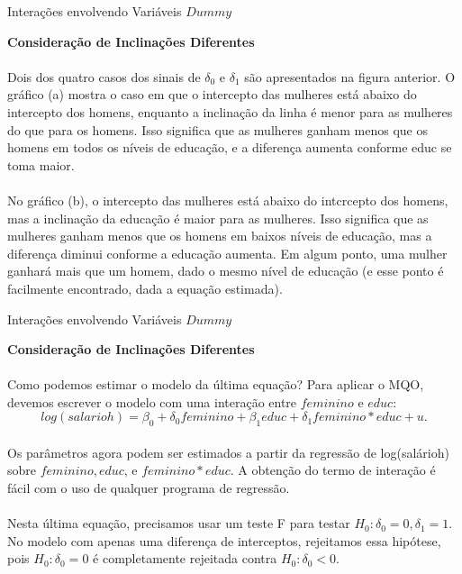 \documentclass[t,14pt,mathserif]{beamer}
\begin{document}
{
\begin{frame}{Interações envolvendo Variáveis $Dummy$}
		\begin{tcolorbox}
			\indent\textbf{\small{Consideração de Inclinações Diferentes}}\\ 
			\\ \footnotesize{Dois dos quatro casos dos sinais de $\delta_{0}$ e $\delta_{1}$ são apresentados na figura anterior. O gráfico (a) mostra o caso em que o intercepto das mulheres está abaixo do intercepto dos homens, enquanto a inclinação da linha é menor para as mulheres do que para os homens. Isso significa que as mulheres ganham menos que os homens em todos os níveis de educação, e a diferença aumenta conforme educ se toma maior}.\\
			\\ \footnotesize{No gráfico (b), o intercepto das mulheres está abaixo do intcrcepto
            dos homens, mas a inclinação da educação é maior para as mulheres. Isso significa que as mulheres ganham menos que os homens em baixos níveis de educação, mas a diferença diminui conforme a educação aumenta. Em algum ponto, uma mulher ganhará mais que um homem, dado o mesmo nível de educação (e esse ponto é facilmente encontrado, dada a equação estimada).}
			
			
		\end{tcolorbox}
       
\end{frame}
}  

{
\begin{frame}{Interações envolvendo Variáveis $Dummy$}
		\begin{tcolorbox}
			\indent\textbf{\small{Consideração de Inclinações Diferentes}}\\ 
			\\ \footnotesize{Como podemos estimar o modelo da última equação? Para aplicar o MQO, devemos escrever o modelo com uma interação entre $feminino$ e $educ$}:\\
			\begin{equation}
			log(salarioh) = \beta_{0} + \delta_{0}feminino + \beta_{1}educ + \delta_{1}feminino*educ + u.\label{eq1}\nonumber
			\end{equation}
			\\ \footnotesize{Os parâmetros agora podem ser estimados a partir da regressão de log(salárioh) sobre $feminino,educ$, e $feminino*educ$. A obtenção do termo de interação é fácil com o uso de qualquer programa de regressão.}\\
		    \\ \footnotesize{Nesta última equação, precisamos usar um teste F para testar $H_0 : \delta_{0} = 0, \delta_{1} = 1$. No modelo com apenas uma diferença de interceptos, rejeitamos essa hipótese, pois $H_0: \delta_{0} = 0$ é completamente rejeitada contra $H_0: \delta_{0} < 0$}.
		\end{tcolorbox}
       
\end{frame}
}
\end{document}
